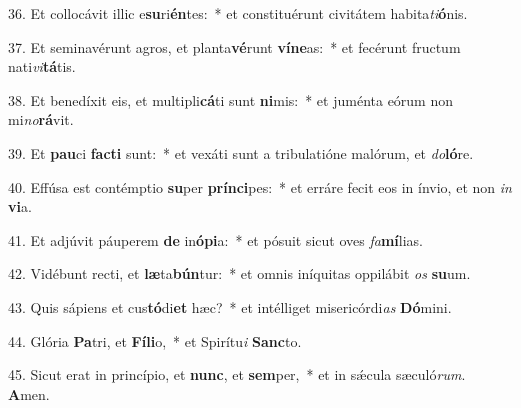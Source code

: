 36. Et collocávit illic e\textbf{su}ri\textbf{én}tes:~*  et constituérunt civitátem habita\textit{ti}\textbf{ó}nis.\

37. Et seminavérunt agros, et planta\textbf{vé}runt \textbf{ví}\textbf{ne}as:~*  et fecérunt fructum nati\textit{vi}\textbf{tá}tis.\

38. Et benedíxit eis, et multipli\textbf{cá}ti sunt \textbf{ni}mis:~*  et juménta eórum non mi\textit{no}\textbf{rá}vit.\

39. Et \textbf{pau}ci \textbf{fac}\textbf{ti} sunt:~*  et vexáti sunt a tribulatióne malórum, et \textit{do}\textbf{ló}re.\

40. Effúsa est contémptio \textbf{su}per \textbf{prín}\textbf{ci}pes:~*  et erráre fecit eos in ínvio, et non \textit{in} \textbf{vi}a.\

41. Et adjúvit páuperem \textbf{de} in\textbf{ó}\textbf{pi}a:~*  et pósuit sicut oves \textit{fa}\textbf{mí}lias.\

42. Vidébunt recti, et \textbf{læ}ta\textbf{bún}tur:~*  et omnis iníquitas oppilábit \textit{os} \textbf{su}um.\

43. Quis sápiens et cus\textbf{tó}di\textbf{et} hæc?~*  et intélliget misericórdi\textit{as} \textbf{Dó}mini.\

44. Glória \textbf{Pa}tri, et \textbf{Fí}\textbf{li}o,~*  et Spirítu\textit{i} \textbf{Sanc}to.\

45. Sicut erat in princípio, et \textbf{nunc}, et \textbf{sem}per,~*  et in sǽcula sæculó\textit{rum}. \textbf{A}men.\

